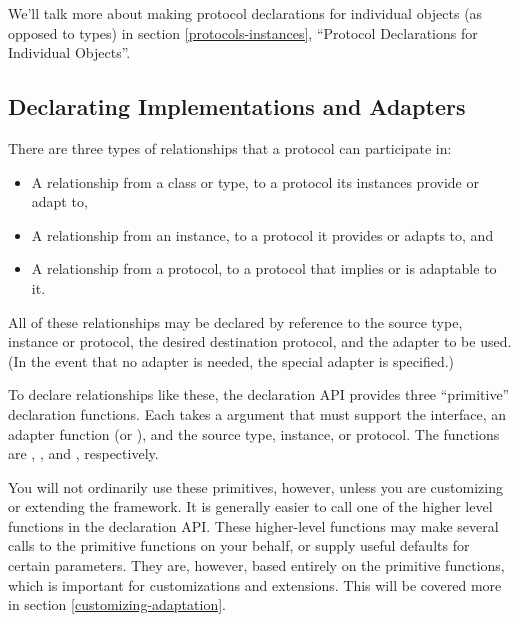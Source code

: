 \begin{verbatim%
}
\begin{verbatim%
}
\begin{verbatim%
}
\begin{verbatim%
}
\begin{description}
We'll talk more about making protocol declarations for individual objects
(as opposed to types) in section \ref{protocols-instances}, ``Protocol
Declarations for Individual Objects''.

\end{description}











\subsection{Declarating Implementations and Adapters}

There are three types of relationships that a protocol can participate in:

\begin{itemize}
\item A relationship from a class or type, to a protocol its instances provide
or adapt to,

\item A relationship from an instance, to a protocol it provides or adapts to,
and

\item A relationship from a protocol, to a protocol that implies or is adaptable
to it.
\end{itemize}

All of these relationships may be declared by reference to the source type,
instance or protocol, the desired destination protocol, and the adapter to be
used. (In the event that no adapter is needed, the special adapter
 is specified.)

To declare relationships like these, the  declaration API
provides three ``primitive'' declaration functions.  Each takes a 
argument that must support the  interface, an
adapter function (or ), and the source
type, instance, or protocol.  The functions are
, , and
, respectively.

You will not ordinarily use these primitives, however, unless you are
customizing or extending the framework.  It is generally easier to call one
of the higher level functions in the declaration API.  These higher-level
functions may make several calls to the primitive functions on your behalf, or
supply useful defaults for certain parameters.  They are, however, based
entirely on the primitive functions, which is important for customizations and
extensions.  This will be covered more in section \ref{customizing-adaptation}.


\end{verbatim%
}
\end{verbatim%
}
\end{verbatim%
}
\end{verbatim%
}

